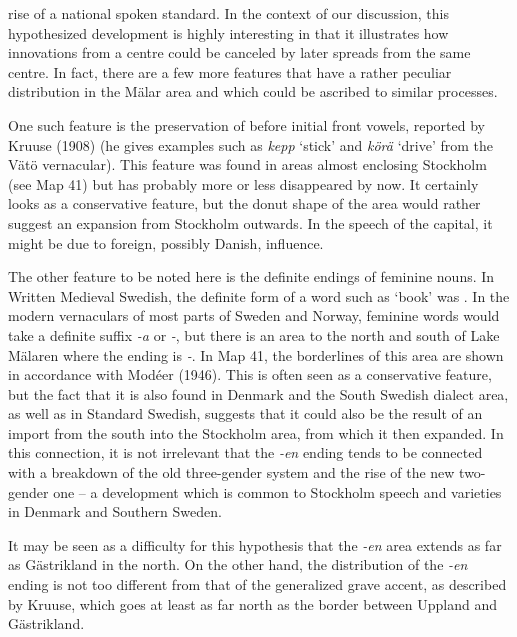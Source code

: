 rise of a national spoken standard. In the context of our discussion, this hypothesized development is highly interesting in that it illustrates how innovations from a centre could be canceled by later spreads from the same centre. In fact, there are a few more features that have a rather peculiar distribution in the Mälar area and which could be ascribed to similar processes. 

One such feature is the preservation of  before initial front vowels, reported by Kruuse (1908) (he gives examples such as \textit{kepp} ‘stick’ and \textit{körä} ‘drive’ from the Vätö vernacular). This feature was found in areas almost enclosing Stockholm (see Map 41) but has probably more or less disappeared by now. It certainly looks as a conservative feature, but the donut shape of the area would rather suggest an expansion from Stockholm outwards. In the speech of the capital, it might be due to foreign, possibly Danish, influence.

The other feature to be noted here is the definite endings of feminine nouns. In Written Medieval Swedish, the definite form of a word such as  ‘book’ was . In the modern vernaculars of most parts of Sweden and Norway, feminine words would take a definite suffix\textit{ {}-a} or\textit{ {}-}, but there is an area to the north and south of Lake Mälaren where the ending is\textit{ {}-}. In Map 41, the borderlines of this area are shown in accordance with Modéer (1946). This is often seen as a conservative feature, but the fact that it is also found in Denmark and the South Swedish dialect area, as well as in Standard Swedish, suggests that it could also be the result of an import from the south into the Stockholm area, from which it then expanded. In this connection, it is not irrelevant that the \textit{{}-en} ending tends to be connected with a breakdown of the old three-gender system and the rise of the new two-gender one – a development which is common to Stockholm speech and varieties in Denmark and Southern Sweden.

It may be seen as a difficulty for this hypothesis that the \textit{{}-en} area extends as far as Gästrikland in the north. On the other hand, the distribution of the \textit{{}-}\textit{en} ending is not too different from that of the generalized grave accent, as described by Kruuse, which goes at least as far north as the border between Uppland and Gästrikland.

